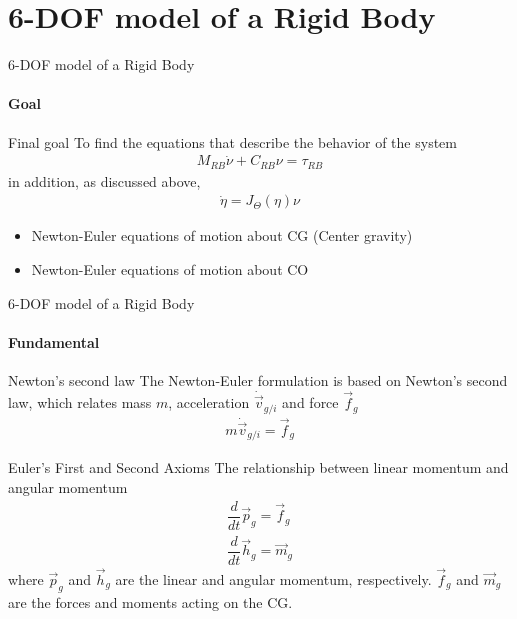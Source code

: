 \section{6-DOF model of a Rigid Body}


\begin{frame}{6-DOF model of a Rigid Body}
	\framesubtitle{Goal} 
	\begin{block}{Final goal}
		To find the equations that describe the behavior of the system
		\begin{align}
			M_{RB}\dot{\nu} + C_{RB}\nu = \tau_{RB}
		\end{align}
		in addition, as discussed above, 
		\begin{align}
			\dot{\eta} = J_{\Theta}(\eta)\nu
		\end{align}
	\end{block}
	\begin{itemize}
		\item Newton-Euler equations of motion about CG (Center gravity)
		\item Newton-Euler equations of motion about CO
	\end{itemize}
\end{frame}





\begin{frame}{6-DOF model of a Rigid Body}
	\framesubtitle{Fundamental}
	
	\begin{block}{Newton's second law}
		The Newton-Euler formulation is based on Newton's second law, which relates mass $m$, acceleration $\dot{\vec{v}}_{g/i}$ and force $\vec{f}_g$
		\begin{align}
			m\dot{\vec{v}}_{g/i} = \vec{f}_g
		\end{align}
	\end{block}
	
	\begin{block}{Euler's First and Second Axioms}
		The relationship between linear momentum and angular momentum
		\begin{align}
			\dfrac{d}{dt}\vec{p}_{g} = \vec{f}_g\\
			\dfrac{d}{dt}\vec{h}_{g} = \vec{m}_g
		\end{align}
		where $\vec{p}_{g}$ and $\vec{h}_{g}$ are the linear and angular momentum, respectively. $\vec{f}_g$ and $\vec{m}_g$ are the forces and moments acting on the CG.
	\end{block}
\end{frame}



